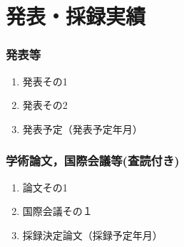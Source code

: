 \chapter*{発表・採録実績}


\subsection*{発表等}
\begin{enumerate}
\renewcommand{\labelenumi}{[\arabic{enumi}]}
    \item 発表その1
    \item 発表その2
    \item 発表予定（発表予定年月）
\end{enumerate}

\subsection*{学術論文，国際会議等(査読付き)}
\begin{enumerate}
\renewcommand{\labelenumi}{[\arabic{enumi}]}
    \item 論文その1
    \item 国際会議その１
    \item 採録決定論文（採録予定年月）
\end{enumerate}